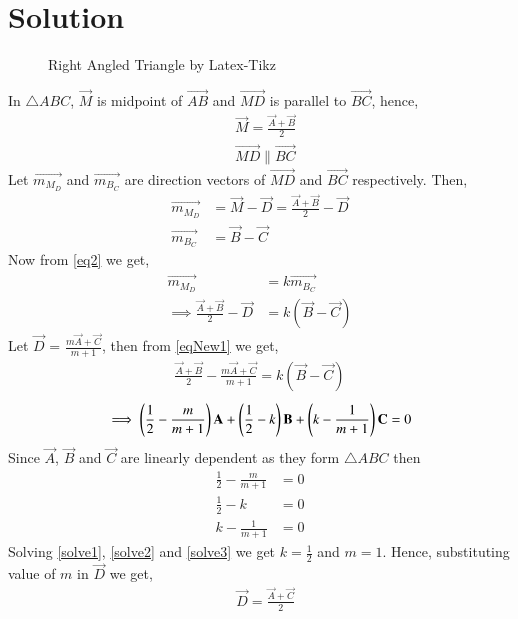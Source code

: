 \documentclass[journal,12pt,twocolumn]{IEEEtran}
\begin{document}
\section{Solution}
\renewcommand{\thefigure}{1}
\begin{figure}[!h]
\centering
\resizebox{\columnwidth}{!}{}
\caption{Right Angled Triangle by Latex-Tikz}
\label{myfig}
\end{figure}
In $\triangle{ABC}$, $\vec{M}$ is midpoint of $\vec{AB}$ and $\vec{MD}$ is parallel to $\vec{BC}$, hence,
\begin{align}
&\vec{M} = \frac{\vec{A}+\vec{B}}{2}\label{eq1}\\
&\vec{MD} \parallel \vec{BC}\label{eq2}
\end{align}
Let $\vec{m_M_D}$ and $\vec{m_B_C}$ are direction vectors of $\vec{MD}$ and $\vec{BC}$ respectively. Then,
\begin{align}
\vec{m_M_D} &= \vec{M} - \vec{D} = \frac{\vec{A}+\vec{B}}{2} - \vec{D}\\
\vec{m_B_C} &= \vec{B} - \vec{C}
\end{align}
Now from \eqref{eq2} we get,
\begin{align}
\vec{m_M_D} &= k\vec{m_B_C}\\
\implies\frac{\vec{A}+\vec{B}}{2} - \vec{D} &= k(\vec{B} - \vec{C})\label{eqNew1}
\end{align}
Let $\vec{D}$ = $\frac{m\vec{A}+\vec{C}}{m+1}$, then from \eqref{eqNew1} we get,
\begin{align}
\frac{\vec{A}+\vec{B}}{2} - \frac{m\vec{A}+\vec{C}}{m+1} = k(\vec{B} - \vec{C})
\end{align}
\begin{align}
\implies\left(\frac{1}{2}-\frac{m}{m+1}\right)\mathbf{A}+\left(\frac{1}{2}-k\right)\mathbf{B}+\left(k-\frac{1}{m+1}\right)\mathbf{C} =0
\end{align}
Since $\vec{A}$, $\vec{B}$ and $\vec{C}$ are linearly dependent as they form $\triangle{ABC}$ then 
\begin{align}
\frac{1}{2}-\frac{m}{m+1} &= 0\label{solve1}\\
\frac{1}{2}-k & = 0\label{solve2}\\
k-\frac{1}{m+1} &= 0\label{solve3}
\end{align}
Solving \eqref{solve1}, \eqref{solve2} and \eqref{solve3} we get $k=\frac{1}{2}$ and $m = 1$. Hence, substituting value of $m$ in $\vec{D}$ we get,
\begin{align}
&\vec{D} = \frac{\vec{A}+\vec{C}}{2}\label{eq3}
\end{align}
\end{document}
